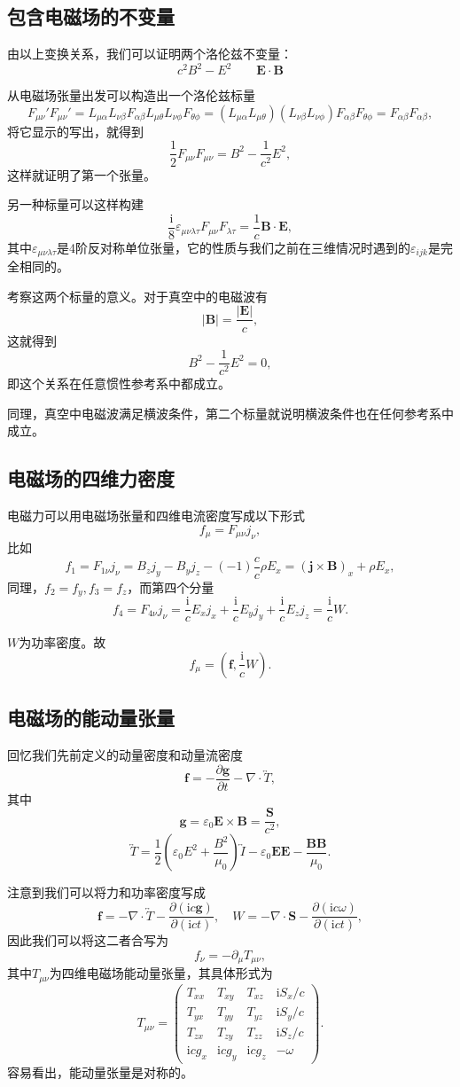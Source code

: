 \documentclass[UTF8]{ctexbook}
\renewcommand{\b}{\boldsymbol}
\renewcommand{\i}{\mathrm{i}}
\renewcommand{\t}{\overleftrightarrow}
\numberwithin{equation}{chapter}
\begin{document}
	\subsection{包含电磁场的不变量}
	由以上变换关系，我们可以证明两个洛伦兹不变量：
	\[c^2B^2-E^2 \qquad \b{E}\cdot\b{B}\]
	
	从电磁场张量出发可以构造出一个洛伦兹标量
	\[F_{\mu\nu}'F_{\mu\nu}'=L_{\mu\alpha}L_{\nu\beta}F_{\alpha\beta}L_{\mu\theta}L_{\nu\phi}F_{\theta\phi}=(L_{\mu\alpha}L_{\mu\theta})(L_{\nu\beta}L_{\nu\phi})F_{\alpha\beta}F_{\theta\phi}=F_{\alpha\beta}F_{\alpha\beta},\]
	将它显示的写出，就得到
	\[\frac{1}{2}F_{\mu\nu}F_{\mu\nu}=B^2-\frac{1}{c^2}E^2,\]
	这样就证明了第一个张量。
	
	另一种标量可以这样构建
	\[\frac{\i}{8}\varepsilon_{\mu\nu\lambda\tau}F_{\mu\nu}F_{\lambda\tau}=\frac{1}{c}\b{B}\cdot\b{E},\]
	其中$\varepsilon_{\mu\nu\lambda\tau}$是4阶反对称单位张量，它的性质与我们之前在三维情况时遇到的$\varepsilon_{ijk}$是完全相同的。
	
	考察这两个标量的意义。对于真空中的电磁波有
	\[|\b{B}|=\frac{|\b{E}|}{c},\]
	这就得到
	\[B^2-\frac{1}{c^2}E^2=0,\]
	即这个关系在任意惯性参考系中都成立。
	
	同理，真空中电磁波满足横波条件，第二个标量就说明横波条件也在任何参考系中成立。
	
	\subsection{电磁场的四维力密度}
	
	电磁力可以用电磁场张量和四维电流密度写成以下形式
	\[f_\mu=F_{\mu\nu}j_\nu,\]
	比如
	\[f_1=F_{1\nu}j_\nu=B_zj_y-B_yj_z-(-1)\frac{c}{c}\rho E_x=(\b{j}\times\b{B})_x+\rho E_x,\]
	同理，$f_2=f_y,f_3=f_z$，而第四个分量
	\[f_4=F_{4\nu}j_\nu=\frac{\i}{c}E_xj_x+\frac{\i}{c}E_yj_y+\frac{\i}{c}E_zj_z=\frac{\i}{c}W.\]
	
	$W$为功率密度。故
	\[f_\mu=(\b{f},\frac{\i}{c}W).\]
	       
	\subsection{电磁场的能动量张量}
	回忆我们先前定义的动量密度和动量流密度
	\[\b{f}=-\frac{\partial \b{g}}{\partial t}-\nabla\cdot\t{T},\]
	其中
	\[\b{g}=\varepsilon_0\b{E}\times\b{B}=\frac{\b{S}}{c^2},\]
	\[\t{T}=\frac{1}{2}\left(\varepsilon_0E^2+\frac{B^2}{\mu_0}\right)\t{I}-\varepsilon_0\b{E}\b{E}-\frac{\b{B}\b{B}}{\mu_0}.\]
	
	
	注意到我们可以将力和功率密度写成
	\[\b{f}=-\nabla\cdot\t{T}-\frac{\partial(\i c \b{g})}{\partial (\i ct)},\quad W=-\nabla\cdot\b{S}-\frac{\partial(\i c \omega)}{\partial (\i ct)},\]
	因此我们可以将这二者合写为
	\[f_\nu=-\partial_\mu T_{\mu\nu},\]
	其中$T_{\mu\nu}$为四维电磁场能动量张量，其具体形式为
	\[T_{\mu\nu}=\begin{pmatrix}
		T_{xx} & T_{xy} & T_{xz} & \i S_x/c \\
		T_{yx} & T_{yy} & T_{yz} & \i S_y/c \\
		T_{zx} & T_{zy} & T_{zz} & \i S_z/c \\
		\i cg_x & \i cg_y & \i c g_z & -\omega
	\end{pmatrix}.\]
	容易看出，能动量张量是对称的。
	
\end{document}
